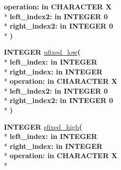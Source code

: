 \begin{DoxyCompactItemize}
{\bfseries \textcolor{vhdlchar}{operation\+: }\textcolor{stringliteral}{in }\textcolor{vhdlchar}{C\+H\+A\+R\+A\+C\+T\+E\+R   \textquotesingle{}\+X\textquotesingle{}}}\\*
{\bfseries \textcolor{vhdlchar}{left\+\_\+index2\+: }\textcolor{stringliteral}{in }\textcolor{vhdlchar}{I\+N\+T\+E\+G\+E\+R   0}}\\*
{\bfseries \textcolor{vhdlchar}{right\+\_\+index2\+: }\textcolor{stringliteral}{in }\textcolor{vhdlchar}{I\+N\+T\+E\+G\+E\+R   0}}\\*
{\bfseries  )} 
\item 
{\bfseries {\bfseries \textcolor{comment}{I\+N\+T\+E\+G\+E\+R}\textcolor{vhdlchar}{ }}} \hyperlink{class__fixed__pkg_a4d69efd65f02a7e7bdc4d70b13a6ec7e}{ufixed\+\_\+low}{\bfseries  ( }\\*
{\bfseries \textcolor{vhdlchar}{left\+\_\+index\+: }\textcolor{stringliteral}{in }{\bfseries \textcolor{comment}{I\+N\+T\+E\+G\+E\+R}\textcolor{vhdlchar}{ }}}\\*
{\bfseries \textcolor{vhdlchar}{right\+\_\+index\+: }\textcolor{stringliteral}{in }{\bfseries \textcolor{comment}{I\+N\+T\+E\+G\+E\+R}\textcolor{vhdlchar}{ }}}\\*
{\bfseries \textcolor{vhdlchar}{operation\+: }\textcolor{stringliteral}{in }\textcolor{vhdlchar}{C\+H\+A\+R\+A\+C\+T\+E\+R   \textquotesingle{}\+X\textquotesingle{}}}\\*
{\bfseries \textcolor{vhdlchar}{left\+\_\+index2\+: }\textcolor{stringliteral}{in }\textcolor{vhdlchar}{I\+N\+T\+E\+G\+E\+R   0}}\\*
{\bfseries \textcolor{vhdlchar}{right\+\_\+index2\+: }\textcolor{stringliteral}{in }\textcolor{vhdlchar}{I\+N\+T\+E\+G\+E\+R   0}}\\*
{\bfseries  )} 
\item 
{\bfseries {\bfseries \textcolor{comment}{I\+N\+T\+E\+G\+E\+R}\textcolor{vhdlchar}{ }}} \hyperlink{class__fixed__pkg_aa4fe04f18cc45d8b6513466ca7e9c319}{sfixed\+\_\+high}{\bfseries  ( }\\*
{\bfseries \textcolor{vhdlchar}{left\+\_\+index\+: }\textcolor{stringliteral}{in }{\bfseries \textcolor{comment}{I\+N\+T\+E\+G\+E\+R}\textcolor{vhdlchar}{ }}}\\*
{\bfseries \textcolor{vhdlchar}{right\+\_\+index\+: }\textcolor{stringliteral}{in }{\bfseries \textcolor{comment}{I\+N\+T\+E\+G\+E\+R}\textcolor{vhdlchar}{ }}}\\*
{\bfseries \textcolor{vhdlchar}{operation\+: }\textcolor{stringliteral}{in }\textcolor{vhdlchar}{C\+H\+A\+R\+A\+C\+T\+E\+R   \textquotesingle{}\+X\textquotesingle{}}}\\*

\end{DoxyCompactItemize}
